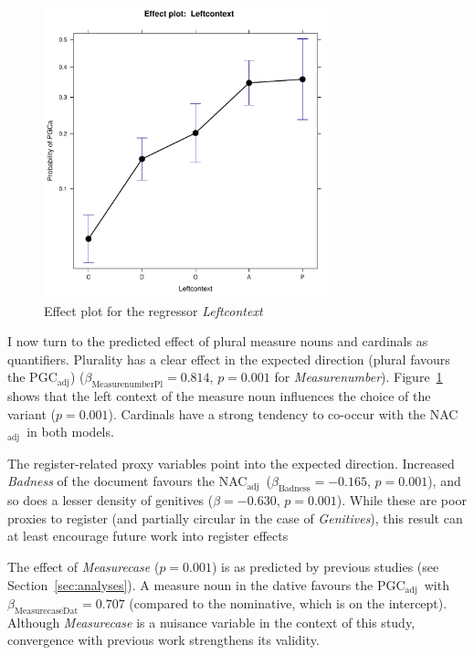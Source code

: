 \documentclass[USenglish]{article}
\newcommand{\Sub}[1]{\ensuremath{\mathrm{_{#1}}}}
\newcommand{\NACa}{NAC\Sub{adj}}
\newcommand{\PGCa}{PGC\Sub{adj}}
\begin{document}
\begin{figure}[h!]
  \centering
  \includegraphics[width=0.75\textwidth]{../R/output/corpus_Leftcontext}
  \caption{Effect plot for the regressor \textit{Leftcontext}}
  \label{fig:eff:leftcontext}
\end{figure}

I now turn to the predicted effect of plural measure nouns and cardinals as quantifiers.
Plurality has a clear effect in the expected direction (plural favours the \PGCa) ($\beta_{\text{MeasurenumberPl}}=0.814$, $p=0.001$ for \textit{Measurenumber}).
Figure~\ref{fig:eff:leftcontext} shows that the left context of the measure noun influences the choice of the variant ($p=0.001$).
Cardinals have a strong tendency to co-occur with the \NACa\ in both models.


The register-related proxy variables point into the expected direction.
Increased \textit{Badness} of the document favours the \NACa\ ($\beta_{\text{Badness}}=-0.165$, $p=0.001$), and so does a lesser density of genitives ($\beta=-0.630$, $p=0.001$).
While these are poor proxies to register (and partially circular in the case of \textit{Genitives}), this result can at least encourage future work into register effects 


The effect of \textit{Measurecase} ($p=0.001$) is as predicted by previous studies (see Section~\ref{sec:analyses}).
A measure noun in the dative favours the \PGCa\ with $\beta_{\text{MeasurecaseDat}}=0.707$ (compared to the nominative, which is on the intercept).
Although \textit{Measurecase} is a nuisance variable in the context of this study, convergence with previous work strengthens its validity.
\end{document}
